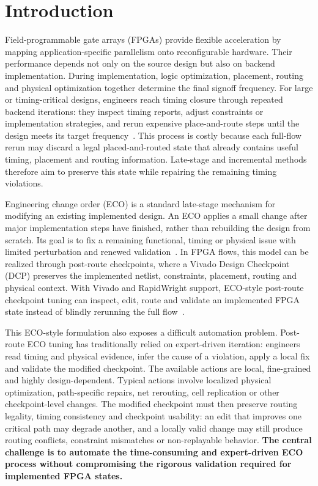 \documentclass[conference]{IEEEtran}
\begin{document}
\section{Introduction}
\label{sec:introduction}

Field-programmable gate arrays (FPGAs) provide flexible acceleration by
mapping application-specific parallelism onto reconfigurable hardware.
Their performance depends not only on the source design but also on
backend implementation. During implementation, logic optimization,
placement, routing and physical optimization together determine the
final signoff frequency. For large or timing-critical designs, engineers
reach timing closure through repeated backend iterations: they inspect
timing reports, adjust constraints or implementation strategies, and
rerun expensive place-and-route steps until the design meets its target
frequency~\cite{amd_ug904_2025,amd_ug906_2025,amd_ug949_2025}. This
process is costly because each full-flow rerun may discard a legal
placed-and-routed state that already contains useful timing, placement
and routing information. Late-stage and incremental methods therefore
aim to preserve this state while repairing the remaining timing
violations.

Engineering change order (ECO) is a standard late-stage mechanism for
modifying an existing implemented design. An ECO applies a small
change after major implementation steps have finished,
rather than rebuilding the design from scratch. Its goal is to fix a
remaining functional, timing or physical issue with limited
perturbation and renewed
validation~\cite{jiang_ir_aware_eco_2024,azadi_graph_based_eco_2026,
rapidwright_eco_tutorial_2025}. In FPGA flows, this model can be
realized through post-route checkpoints, where a Vivado Design
Checkpoint (DCP) preserves the implemented netlist, constraints,
placement, routing and physical context. With Vivado and RapidWright
support, ECO-style post-route checkpoint tuning can inspect, edit,
route and validate an implemented FPGA state instead of blindly
rerunning the full
flow~\cite{amd_ug904_2025,rapidwright_documentation_2025,
zhou_rwroute_2022}.

This ECO-style formulation also exposes a difficult automation
problem. Post-route ECO tuning has traditionally relied on
expert-driven iteration: engineers read timing and physical evidence,
infer the cause of a violation, apply a local fix and validate the
modified checkpoint. The available actions are local, fine-grained and
highly design-dependent. Typical actions involve localized physical
optimization, path-specific repairs, net rerouting, cell replication or
other checkpoint-level changes. The modified checkpoint must then
preserve routing legality, timing consistency and checkpoint usability:
an edit that improves one critical path may degrade another, and a
locally valid change may still produce routing conflicts, constraint
mismatches or non-replayable behavior. \textbf{
The central challenge is to automate the time-consuming and expert-driven ECO process without compromising the rigorous validation required for implemented FPGA states.}
\end{document}
